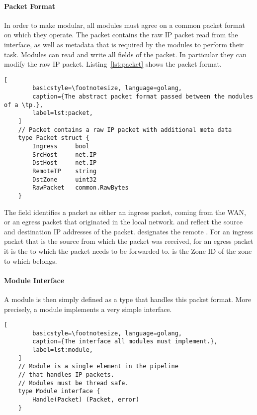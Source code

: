 \paragraph{Packet Format}
In order to make \tps modular, all modules must agree on a common packet format on which they
operate. The packet contains the raw IP packet read from the interface, as well as metadata
that is required by the modules to perform their task. Modules can read and write all fields of the
packet. In particular they can modify the raw IP packet.
Listing~\ref{lst:packet} shows the packet format.

\begin{minipage}{\linewidth}
	\begin{lstlisting}[
		basicstyle=\footnotesize, language=golang,
		caption={The abstract packet format passed between the modules of a \tp.},
		label=lst:packet,
	]
	// Packet contains a raw IP packet with additional meta data
	type Packet struct {
		Ingress		bool
		SrcHost 	net.IP
		DstHost 	net.IP
		RemoteTP	string
		DstZone		uint32
		RawPacket 	common.RawBytes
	}
	\end{lstlisting}
\end{minipage}

The field identifies a packet as either an ingress packet,
coming from the WAN, or an egress packet
that originated in the local network.  and  reflect
the source and destination IP addresses of the packet.  designates
the remote \tp. For an ingress packet that is the source \tp from which the packet
was received, for an egress packet it is the \tp to which the packet needs to be
forwarded to.  is the Zone ID of the zone to which 
belongs.

\paragraph{Module Interface}
A module is then simply defined as a type that handles this packet format.
More precisely, a module implements a very simple  interface.

\begin{minipage}{\linewidth}
	\begin{lstlisting}[
		basicstyle=\footnotesize, language=golang,
		caption={The interface all modules must implement.},
		label=lst:module,
	]
	// Module is a single element in the pipeline
	// that handles IP packets.
	// Modules must be thread safe.
	type Module interface {
		Handle(Packet) (Packet, error)
	}
	\end{lstlisting}
\end{minipage}

